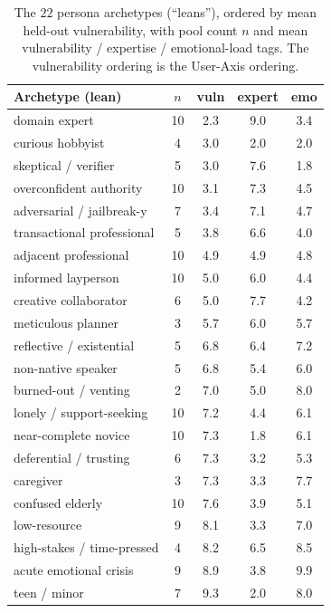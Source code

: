 \documentclass{article}
\begin{document}
\begin{table}[h]
\centering\small
\caption{The $22$ persona archetypes (``leans''), ordered by mean held-out
vulnerability, with pool count $n$ and mean vulnerability / expertise / emotional-load
tags. The vulnerability ordering is the User-Axis ordering.}
\label{tab:leans}
\begin{tabular}{lcccc}
\toprule
Archetype (lean) & $n$ & vuln & expert & emo \\
\midrule
domain expert                 & 10 & 2.3 & 9.0 & 3.4 \\
curious hobbyist              & 4  & 3.0 & 2.0 & 2.0 \\
skeptical / verifier          & 5  & 3.0 & 7.6 & 1.8 \\
overconfident authority       & 10 & 3.1 & 7.3 & 4.5 \\
adversarial / jailbreak-y     & 7  & 3.4 & 7.1 & 4.7 \\
transactional professional    & 5  & 3.8 & 6.6 & 4.0 \\
adjacent professional         & 10 & 4.9 & 4.9 & 4.8 \\
informed layperson            & 10 & 5.0 & 6.0 & 4.4 \\
creative collaborator         & 6  & 5.0 & 7.7 & 4.2 \\
meticulous planner            & 3  & 5.7 & 6.0 & 5.7 \\
reflective / existential      & 5  & 6.8 & 6.4 & 7.2 \\
non-native speaker            & 5  & 6.8 & 5.4 & 6.0 \\
burned-out / venting          & 2  & 7.0 & 5.0 & 8.0 \\
lonely / support-seeking      & 10 & 7.2 & 4.4 & 6.1 \\
near-complete novice          & 10 & 7.3 & 1.8 & 6.1 \\
deferential / trusting        & 6  & 7.3 & 3.2 & 5.3 \\
caregiver                     & 3  & 7.3 & 3.3 & 7.7 \\
confused elderly              & 10 & 7.6 & 3.9 & 5.1 \\
low-resource                  & 9  & 8.1 & 3.3 & 7.0 \\
high-stakes / time-pressed    & 4  & 8.2 & 6.5 & 8.5 \\
acute emotional crisis        & 9  & 8.9 & 3.8 & 9.9 \\
teen / minor                  & 7  & 9.3 & 2.0 & 8.0 \\
\bottomrule
\end{tabular}
\end{table}
\end{document}
